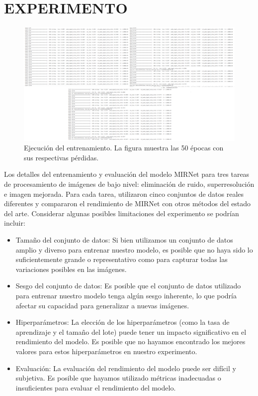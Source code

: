 \documentclass[a4paper,
               ]{jacow}
\begin{document}
\section{EXPERIMENTO}


\begin{figure}[!h]
    \centering
    \includegraphics*[width=.9\textwidth]{entrenamiento}
    \caption{Ejecución del entrenamiento. La figura muestra las 50 épocas con sus respectivas pérdidas.     }
    \label{fig:ejem_Entrenamiento}
\end{figure}

Los detalles del entrenamiento y evaluación del modelo MIRNet para tres tareas de procesamiento de imágenes de bajo nivel: eliminación de ruido, superresolución e imagen mejorada. Para cada tarea, utilizaron cinco conjuntos de datos reales diferentes y compararon el rendimiento de MIRNet con otros métodos del estado del arte. Considerar algunas posibles limitaciones del experimento se podrían incluir:

\begin{itemize}[label=-]
  \item Tamaño del conjunto de datos: Si bien utilizamos un conjunto de datos amplio y diverso para entrenar nuestro modelo, es posible que no haya sido lo suficientemente grande o representativo como para capturar todas las variaciones posibles en las imágenes.
  \item Sesgo del conjunto de datos: Es posible que el conjunto de datos utilizado para entrenar nuestro modelo tenga algún sesgo inherente, lo que podría afectar su capacidad para generalizar a nuevas imágenes.
  \item Hiperparámetros: La elección de los hiperparámetros (como la tasa de aprendizaje y el tamaño del lote) puede tener un impacto significativo en el rendimiento del modelo. Es posible que no hayamos encontrado los mejores valores para estos hiperparámetros en nuestro experimento.
  \item Evaluación: La evaluación del rendimiento del modelo puede ser difícil y subjetiva. Es posible que hayamos utilizado métricas inadecuadas o insuficientes para evaluar el rendimiento del modelo.
\end{itemize}
\end{document}
